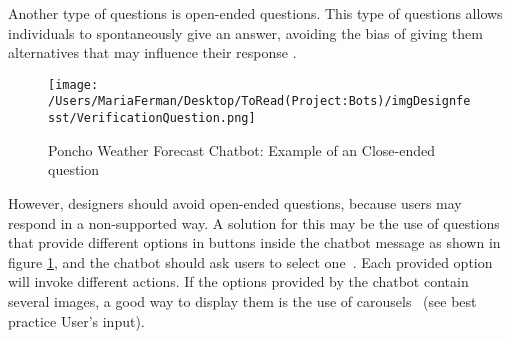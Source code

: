 \documentclass[a4paper,10pt]{article}
\begin{document}
Another type of questions is open-ended questions. This type of questions allows individuals to spontaneously give an answer, avoiding the bias of giving them alternatives that may influence their response \cite{reja2003open} . 


\begin{figure}
\centering
\texttt{[image: /Users/MariaFerman/Desktop/ToRead(Project:Bots)/imgDesignfesst/VerificationQuestion.png]}
\caption{Poncho Weather Forecast Chatbot: Example of an Close-ended question}
\label{FigureVerificationQuestion}
\end{figure}

However, designers should avoid open-ended questions, because users may respond in a non-supported way. A solution for this may be the use of questions that provide different options in buttons inside the chatbot message as shown in figure \ref{FigureVerificationQuestion}, and the chatbot should ask users to select one~\cite{ConversationalUXDesignFacebook}. Each provided option will invoke different actions. If the options provided by the chatbot contain several images, a good way to display them is the use of carousels~\cite{carousel} (see best practice User's input).

\end{document}

